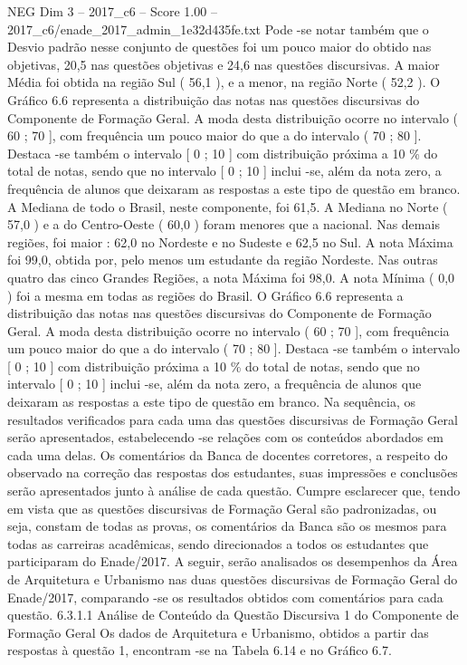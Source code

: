 \begin{textsample}{NEG Dim 3 – 2017\_c6 – Score 1.00 – 2017\_c6/enade\_2017\_admin\_1e32d435fe.txt}
Pode -se notar também que o Desvio padrão nesse conjunto de questões foi um pouco maior do obtido nas objetivas, 20,5 nas questões objetivas e 24,6 nas questões discursivas.
A maior Média foi obtida na região Sul ( 56,1 ), e a menor, na região Norte ( 52,2 ).
O Gráfico 6.6 representa a distribuição das notas nas questões discursivas do Componente de Formação Geral.
A moda desta distribuição ocorre no intervalo ( 60 ; 70 ], com frequência um pouco maior do que a do intervalo ( 70 ; 80 ].
Destaca -se também o intervalo [ 0 ; 10 ] com distribuição próxima a 10 \% do total de notas, sendo que no intervalo [ 0 ; 10 ] inclui -se, além da nota zero, a frequência de alunos que deixaram as respostas a este tipo de questão em branco.
A Mediana de todo o Brasil, neste componente, foi 61,5.
A Mediana no Norte ( 57,0 ) e a do Centro-Oeste ( 60,0 ) foram menores que a nacional.
Nas demais regiões, foi maior : 62,0 no Nordeste e no Sudeste e 62,5 no Sul.
A nota Máxima foi 99,0, obtida por, pelo menos um estudante da região Nordeste.
Nas outras quatro das cinco Grandes Regiões, a nota Máxima foi 98,0.
A nota Mínima ( 0,0 ) foi a mesma em todas as regiões do Brasil.
O Gráfico 6.6 representa a distribuição das notas nas questões discursivas do Componente de Formação Geral.
A moda desta distribuição ocorre no intervalo ( 60 ; 70 ], com frequência um pouco maior do que a do intervalo ( 70 ; 80 ].
Destaca -se também o intervalo [ 0 ; 10 ] com distribuição próxima a 10 \% do total de notas, sendo que no intervalo [ 0 ; 10 ] inclui -se, além da nota zero, a frequência de alunos que deixaram as respostas a este tipo de questão em branco.
Na sequência, os resultados verificados para cada uma das questões discursivas de Formação Geral serão apresentados, estabelecendo -se relações com os conteúdos abordados em cada uma delas.
Os comentários da Banca de docentes corretores, a respeito do observado na correção das respostas dos estudantes, suas impressões e conclusões serão apresentados junto à análise de cada questão.
Cumpre esclarecer que, tendo em vista que as questões discursivas de Formação Geral são padronizadas, ou seja, constam de todas as provas, os comentários da Banca são os mesmos para todas as carreiras acadêmicas, sendo direcionados a todos os estudantes que participaram do Enade/2017.
A seguir, serão analisados os desempenhos da Área de Arquitetura e Urbanismo nas duas questões discursivas de Formação Geral do Enade/2017, comparando -se os resultados obtidos com comentários para cada questão. 6.3.1.1 Análise de Conteúdo da Questão Discursiva 1 do Componente de Formação Geral Os dados de Arquitetura e Urbanismo, obtidos a partir das respostas à questão 1, encontram -se na Tabela 6.14 e no Gráfico 6.7.

\end{textsample}
